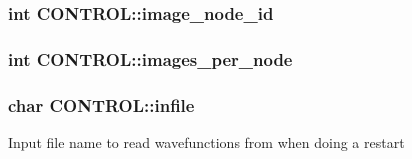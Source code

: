 \hypertarget{struct_c_o_n_t_r_o_l_a481526fba82192706357a730e0807470}{
\subsubsection[{image\-\_\-node\-\_\-id}]{\setlength{\rightskip}{0pt plus 5cm}int C\-O\-N\-T\-R\-O\-L\-::image\-\_\-node\-\_\-id}}\label{struct_c_o_n_t_r_o_l_a481526fba82192706357a730e0807470}
\hypertarget{struct_c_o_n_t_r_o_l_a8fa49b12c64048ae5dff0df20e6ca6ea}{
\subsubsection[{images\-\_\-per\-\_\-node}]{\setlength{\rightskip}{0pt plus 5cm}int C\-O\-N\-T\-R\-O\-L\-::images\-\_\-per\-\_\-node}}\label{struct_c_o_n_t_r_o_l_a8fa49b12c64048ae5dff0df20e6ca6ea}
\hypertarget{struct_c_o_n_t_r_o_l_a10b0ee0d0445c2344f578869f79fbea8}{
\subsubsection[{infile}]{\setlength{\rightskip}{0pt plus 5cm}char C\-O\-N\-T\-R\-O\-L\-::infile}}\label{struct_c_o_n_t_r_o_l_a10b0ee0d0445c2344f578869f79fbea8}
Input file name to read wavefunctions from when doing a restart

